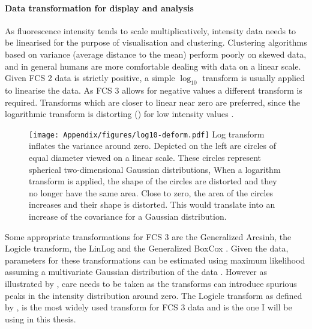 \paragraph{Data transformation for display and analysis}
As fluorescence intensity tends to scale multiplicatively, intensity data needs to be linearised for the purpose of visualisation and clustering.
Clustering algorithms based on variance (average distance to the mean) perform poorly on skewed data, and in general humans are more comfortable dealing
with data on a linear scale.
Given FCS 2 data is strictly positive, a simple $\log_{10}$ transform is usually applied to linearise the data.
As FCS 3 allows for negative values a different transform is required.
Transforms which are closer to linear near zero are preferred, 
since the logarithmic transform is distorting ()
for low intensity values \citep{Durbin:2002tj,Tung:2006uw}.
\begin{figure}
\centering
\texttt{[image: Appendix/figures/log10-deform.pdf]}
{Log transform inflates the variance around zero.}
{
  Depicted on the left are circles of equal diameter viewed on a linear scale.
  These circles represent spherical two-dimensional Gaussian distributions, 
  When a logarithm transform is applied, the shape of the circles are distorted and they no longer have the same area.
  Close to zero, the area of the circles increases and their shape is distorted.
  This would translate into an increase of the covariance for a Gaussian distribution.
}
\end{figure}
Some appropriate transformations for FCS 3 are the Generalized Arcsinh, the Logicle transform,
the LinLog and the Generalized BoxCox \citep{Bagwell:2005he,Parks:2006gaa,Finak:2010is}.
Given the data, parameters for these transformations can be estimated using maximum likelihood assuming a multivariate Gaussian distribution of the data \citep{Finak:2010is}. 
However as illustrated by \citet{Tung:2006uw}, care needs to be taken as the transforms can introduce spurious peaks in the intensity distribution around zero.
The Logicle transform as defined by \citet{Parks:2006gaa},
is the most widely used transform for FCS 3 data and is the one I will be using in this thesis.
